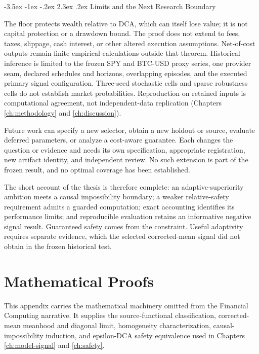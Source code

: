 \documentclass[12pt,a4paper,oneside]{report}
\makeatletter
\renewcommand\section{\@startsection{section}{1}{\z@}%
  {-3.5ex \@plus -1ex \@minus -.2ex}%
  {2.3ex \@plus .2ex}%
  {\normalfont\fontsize{14}{17}\selectfont\bfseries}}
\makeatother
\begin{document}
\section{Limits and the Next Research Boundary}
\label{sec:conclusion-limits}

The floor protects wealth relative to DCA, which can itself lose value; it is
not capital protection or a drawdown bound. The proof does not extend to fees,
taxes, slippage, cash interest, or other altered execution assumptions.
Net-of-cost outputs remain finite empirical calculations outside that theorem.
Historical inference is limited to the frozen SPY and BTC-USD proxy series,
one provider seam, declared schedules and horizons, overlapping episodes, and
the executed primary signal configuration. Three-seed stochastic cells and
sparse robustness cells do not establish market probabilities. Reproduction
on retained inputs is computational agreement, not independent-data replication
(Chapters \ref{ch:methodology} and \ref{ch:discussion}).

Future work can specify a new selector, obtain a new holdout or source,
evaluate deferred parameters, or analyze a cost-aware guarantee. Each changes
the question or evidence and needs its own specification, appropriate
registration, new artifact identity, and independent review. No such extension
is part of the frozen result, and no optimal coverage has been established.

The short account of the thesis is therefore complete: an adaptive-superiority
ambition meets a causal impossibility boundary; a weaker relative-safety
requirement admits a guarded computation; exact accounting identifies its
performance limits; and reproducible evaluation retains an informative
negative signal result. Guaranteed safety comes from the constraint. Useful
adaptivity requires separate evidence, which the selected corrected-mean
signal did not obtain in the frozen historical test.

\appendix
\chapter{Mathematical Proofs}
\label{app:proofs}

This appendix carries the mathematical machinery omitted from the Financial
Computing narrative. It supplies the source-functional classification,
corrected-mean meanhood and diagonal limit, homogeneity characterization,
causal-impossibility induction, and epsilon-DCA safety equivalence used in
Chapters \ref{ch:model-signal} and \ref{ch:safety}.
\end{document}
